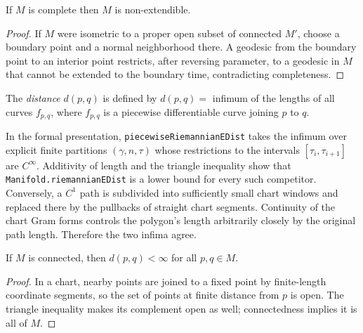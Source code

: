 \begin{proposition}

  \label{prop:dc-ch7-2-3}
  \leanok
If $M$ is complete then $M$ is non-extendible.
\begin{proof}

  \leanok
\sketch If $M$ were isometric to a proper open subset of connected $M'$, choose a boundary point and a normal neighborhood there. A geodesic from the boundary point to an interior point restricts, after reversing parameter, to a geodesic in $M$ that cannot be extended to the boundary time, contradicting completeness.
\end{proof}
\end{proposition}

\begin{definition}[distance]

  \label{def:dc-ch7-2-4}
  \leanok
The \emph{distance} $d(p,q)$ is defined by $d(p,q)=$ infimum of the lengths of all
  curves $f_{p,q}$, where $f_{p,q}$ is a piecewise differentiable curve joining $p$
  to $q$.

  In the formal presentation, \texttt{piecewiseRiemannianEDist} takes the infimum over explicit
  finite partitions $(\gamma,n,\tau)$ whose restrictions to the intervals
  $[\tau_i,\tau_{i+1}]$ are $C^\infty$.  Additivity of length and the triangle inequality show
  that \texttt{Manifold.riemannianEDist} is a lower bound for every such competitor.  Conversely,
  a $C^1$ path is subdivided into sufficiently small chart windows and replaced there by the
  pullbacks of straight chart segments.  Continuity of the chart Gram forms controls the polygon's
  length arbitrarily closely by the original path length.  Therefore the two infima agree.
\end{definition}

\begin{lemma}

  \label{lem:dc-ch7-2-4-finite}
  \leanok
If $M$ is connected, then $d(p,q)<\infty$ for all $p,q\in M$.
\begin{proof}

  \leanok
\sketch In a chart, nearby points are joined to a fixed point by finite-length coordinate segments, so the set of points at finite distance from $p$ is open. The triangle inequality makes its complement open as well; connectedness implies it is all of $M$.
\end{proof}
\end{lemma}

